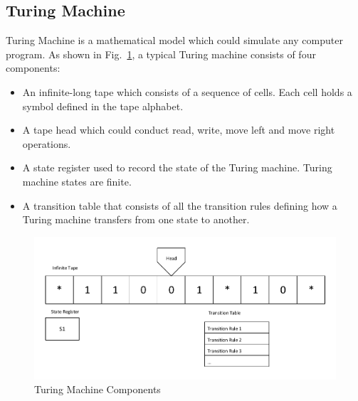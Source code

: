 \documentclass[lnicst]{svmultln}
\newcommand{\F}{Fig.}
\begin{document}
\subsection{Turing Machine}
Turing Machine is a mathematical model which could simulate any computer
program. As shown in \F~\ref{fig:three}, a typical Turing machine consists of
four components:
\begin{itemize}
  \item An infinite-long tape which consists of a sequence of cells. Each cell
    holds a symbol defined in the tape alphabet.
  \item A tape head which could conduct read, write, move left and move right
    operations.
  \item A state register used to record the state of the Turing machine. Turing
    machine states are finite.
  \item A transition table that consists of all the transition rules defining
    how a Turing machine transfers from one state to another.
\end{itemize}

\begin{figure}
 \includegraphics[width=0.9\linewidth]{TM.pdf}
 \caption{Turing Machine Components}
 \label{fig:three}
\end{figure}

\end{document}
